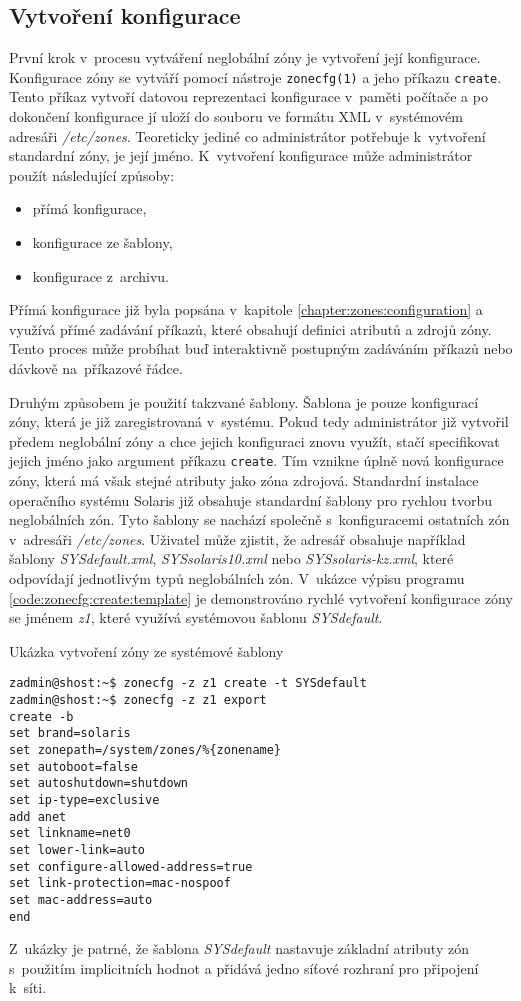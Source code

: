 \subsection{Vytvoření konfigurace}
\label{chapter:zones:configuration:creating}
První krok v~procesu vytváření neglobální zóny je vytvoření její konfigurace. Konfigurace zóny se vytváří pomocí nástroje 
\verb|zonecfg(1)| a jeho příkazu \verb|create|. Tento příkaz vytvoří datovou reprezentaci konfigurace v~paměti počítače a
po dokončení konfigurace jí uloží do souboru ve formátu XML v~systémovém adresáři \textit{/etc/zones}. Teoreticky jediné co
administrátor potřebuje k~vytvoření standardní zóny, je její jméno. K~vytvoření konfigurace může administrátor použít
následující způsoby:
\begin{itemize}
 \item přímá konfigurace,
 \item konfigurace ze šablony,
 \item konfigurace z~archivu.
\end{itemize}
Přímá konfigurace již byla popsána v~kapitole \ref{chapter:zones:configuration} a využívá přímé zadávání příkazů, které obsahují
definici atributů a zdrojů zóny. Tento proces může probíhat buď interaktivně postupným zadáváním příkazů nebo dávkově na~příkazové řádce.

Druhým způsobem je použití takzvané šablony. Šablona je pouze konfigurací zóny, která je již zaregistrovaná
v~systému. Pokud tedy administrátor již vytvořil předem neglobální zóny a chce jejich konfiguraci znovu využít, stačí
specifikovat jejich jméno jako argument příkazu \verb|create|. Tím vznikne úplně nová konfigurace zóny, která má však stejné
atributy jako zóna zdrojová. Standardní instalace operačního systému Solaris již obsahuje standardní šablony pro rychlou tvorbu
neglobálních zón. Tyto šablony se nachází společně s~konfiguracemi ostatních zón v~adresáři \textit{/etc/zones}. Uživatel
může zjistit, že adresář obsahuje například šablony \textit{SYSdefault.xml}, \textit{SYSsolaris10.xml} nebo
\textit{SYSsolaris-kz.xml}, které odpovídají jednotlivým typů neglobálních zón. V~ukázce výpisu programu \ref{code:zonecfg:create:template}
je demonstrováno rychlé vytvoření konfigurace zóny se jménem \textit{z1}, které využívá systémovou šablonu \textit{SYSdefault}.
\begin{listing}[ht]
  \caption{Ukázka vytvoření zóny ze systémové šablony}
  \label{code:zonecfg:create:template}  
  \begin{verbatim}
zadmin@shost:~$ zonecfg -z z1 create -t SYSdefault
zadmin@shost:~$ zonecfg -z z1 export
create -b
set brand=solaris
set zonepath=/system/zones/%{zonename}
set autoboot=false
set autoshutdown=shutdown
set ip-type=exclusive
add anet
set linkname=net0
set lower-link=auto
set configure-allowed-address=true
set link-protection=mac-nospoof
set mac-address=auto
end   
  \end{verbatim}
\end{listing}
Z~ukázky je patrné, že šablona \textit{SYSdefault} nastavuje základní atributy zón s~použitím implicitních hodnot a přidává
jedno síťové rozhraní pro připojení k~síti.

